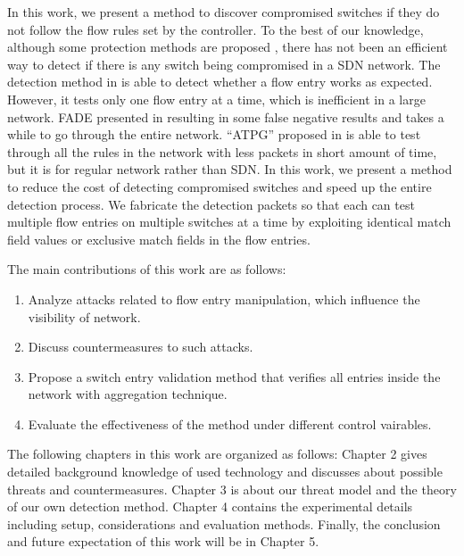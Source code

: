 In this work, we present a method to discover compromised switches if they do not follow the flow rules set by the controller. To the best of our knowledge, although some protection methods are proposed \cite{CKGL15,PJL16}, there has not been an efficient way to detect if there is any switch being compromised in a SDN network. The detection method in \cite{CKGL15} is able to detect whether a flow entry works as expected. However, it tests only one flow entry at a time, which is inefficient in a large network. FADE presented in \cite{PJL16} resulting in some false negative results and takes a while to go through the entire network. ``ATPG'' proposed in \cite{ZKVM12} is able to test through all the rules in the network with less packets in short amount of time, but it is for regular network rather than SDN. In this work, we present a method to reduce the cost of detecting compromised switches and speed up the entire detection process. We fabricate the detection packets so that each can test multiple flow entries on multiple switches at a time by exploiting identical match field values or exclusive match fields in the flow entries. 

The main contributions of this work are as follows:
\begin{enumerate}
\item
Analyze attacks related to flow entry manipulation, which influence the visibility of network.
\item
Discuss countermeasures to such attacks.
\item
Propose a switch entry validation method that verifies all entries inside the network with aggregation technique.
\item
Evaluate the effectiveness of the method under different control vairables.
\end{enumerate}

The following chapters in this work are organized as follows: Chapter 2 gives detailed background knowledge of used technology and discusses about possible threats and countermeasures. Chapter 3 is about our threat model and the theory of our own detection method. Chapter 4 contains the experimental details including setup, considerations and evaluation methods. Finally, the conclusion and future expectation of this work will be in Chapter 5.